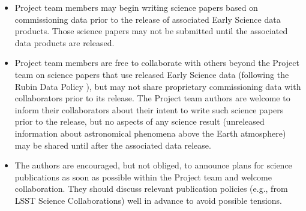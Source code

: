 \documentclass[SE,authoryear,toc,lsstdraft]{lsstdoc}
\begin{document}

\begin{itemize}

  \item Project team members may begin writing science papers based on commissioning data prior to the release of associated Early Science data products.
  Those science papers may not be submitted until the associated data products are released.

  \item Project team members are free to collaborate with others beyond the Project team on science papers that use released Early Science data (following the Rubin Data Policy ), but may not share proprietary commissioning data with collaborators prior to its release.
  The Project team authors are welcome to inform their collaborators about their intent to write such science papers prior to the release, but no aspects of any science result (unreleased information about astronomical phenomena above the Earth atmosphere) may be shared until after the associated data release.

  \item The authors are encouraged, but not obliged, to announce plans for science publications as soon as possible within the Project team and welcome collaboration.
  They should discuss relevant publication policies (e.g., from LSST Science Collaborations) well in advance to avoid possible tensions.





\end{itemize}
\end{document}
